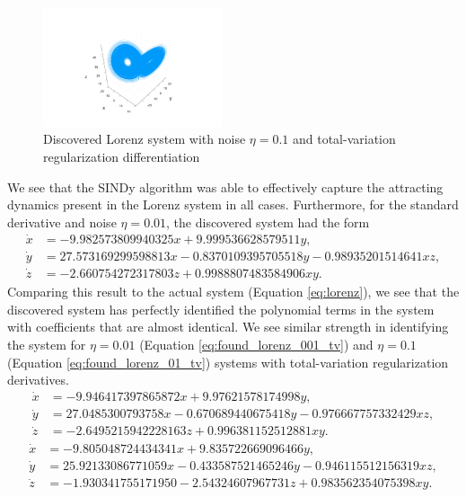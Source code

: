 \documentclass[10pt]{paper}
\begin{document}
\begin{figure}[h]
	\caption{Discovered Lorenz system with noise $\eta = 0.1$ and total-variation regularization differentiation}
	\label{fig:lorenz_system_found_01}

	\centering
	\includegraphics[width = 0.47\textwidth, trim={4.3cm, 1.9cm, 4.3cm, 3.5cm}, clip]{lorenz_found_01_tvdiff.png}
\end{figure}

We see that the SINDy algorithm was able to effectively capture the attracting dynamics present in the Lorenz system in all cases. Furthermore, for the standard derivative and noise $\eta = 0.01$, the discovered system had the form 
\begin{equation} \label{eq:found_lorenz_001}
	\begin{split}
		\dot x &= -9.982573809940325x + 9.999536628579511y, \\
	\dot y &= 27.573169299598813x - 0.8370109395705518y - 0.98935201514641xz, \\
	\dot z &= -2.660754272317803z + 0.9988807483584906xy.
	\end{split}
\end{equation}
Comparing this result to the actual system (Equation \ref{eq:lorenz}), we see that the discovered system has perfectly identified the polynomial terms in the system with coefficients that are almost identical. We see similar strength in identifying the system for $\eta = 0.01$ (Equation \ref{eq:found_lorenz_001_tv}) and $\eta = 0.1$ (Equation \ref{eq:found_lorenz_01_tv}) systems with total-variation regularization derivatives.
\begin{equation} \label{eq:found_lorenz_001_tv}
	\begin{split}
		\dot x &= -9.946417397865872x + 9.97621578174998y, \\
		\dot y &= 27.0485300793758x - 0.670689440675418y - 0.976667757332429xz, \\
		\dot z &= -2.6495215942228163z + 0.996381152512881xy.
	\end{split}
\end{equation}
\begin{equation} \label{eq:found_lorenz_01_tv}
	\begin{split}
		\dot x &= -9.805048724434341x + 9.835722669096466y, \\
		\dot y &= 25.92133086771059x - 0.433587521465246y - 0.946115512156319xz, \\
		\dot z &= -1.930341755171950 - 2.54324607967731z + 0.983562354075398xy.
	\end{split}
\end{equation}
\end{document}
